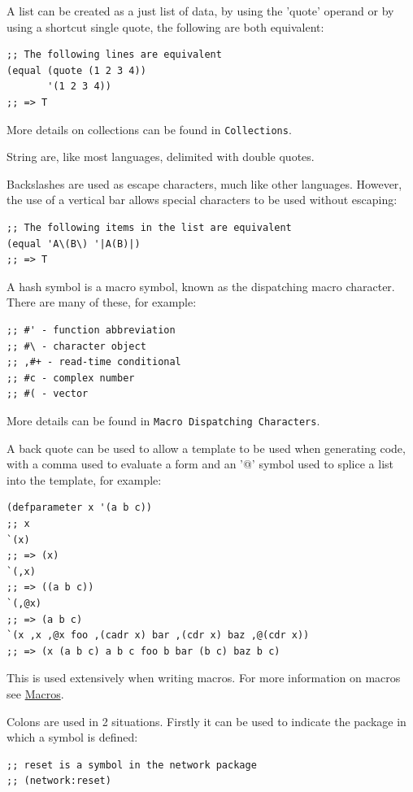 \documentclass[11pt]{article}
\begin{document}
A list can be created as a just list of data, by using the 'quote'
operand or by using a shortcut single quote, the following are both
equivalent:

\begin{verbatim}
;; The following lines are equivalent
(equal (quote (1 2 3 4))
       '(1 2 3 4))
;; => T
\end{verbatim}

More details on collections can be found in \texttt{Collections}.

String are, like most languages, delimited with double quotes.

Backslashes are used as escape characters, much like other
languages. However, the use of a vertical bar allows special
characters to be used without escaping:

\begin{verbatim}
;; The following items in the list are equivalent
(equal 'A\(B\) '|A(B)|)
;; => T
\end{verbatim}

A hash symbol is a macro symbol, known as the dispatching macro
character. There are many of these, for example:

\begin{verbatim}
;; #' - function abbreviation
;; #\ - character object
;; ,#+ - read-time conditional
;; #c - complex number
;; #( - vector
\end{verbatim}

More details can be found in \texttt{Macro Dispatching Characters}.

A back quote can be used to allow a template to be used when
generating code, with a comma used to evaluate a form and an '@'
symbol used to splice a list into the template, for example:

\begin{verbatim}
(defparameter x '(a b c))
;; x
`(x)
;; => (x)
`(,x)
;; => ((a b c))
`(,@x)
;; => (a b c)
`(x ,x ,@x foo ,(cadr x) bar ,(cdr x) baz ,@(cdr x))
;; => (x (a b c) a b c foo b bar (b c) baz b c)
\end{verbatim}

This is used extensively when writing macros. For more information
on macros see \hyperref[sec-13]{Macros}.

Colons are used in 2 situations. Firstly it can be used to indicate
the package in which a symbol is defined:

\begin{verbatim}
;; reset is a symbol in the network package
;; (network:reset)
\end{verbatim}
\end{document}
